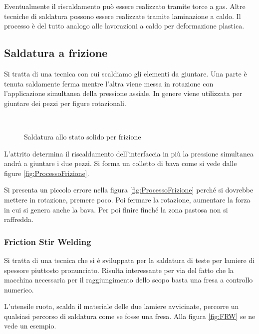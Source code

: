 Eventualmente il riscaldamento può essere realizzato tramite torce a gas. 
Altre tecniche di saldatura possono essere realizzate tramite laminazione a caldo. Il processo è del tutto analogo alle lavorazioni a caldo per deformazione plastica.

\subsection{Saldatura a frizione}
Si tratta di una tecnica con cui scaldiamo gli elementi da giuntare.
Una parte è tenuta saldamente ferma mentre l'altra viene messa in rotazione con l'applicazione simultanea della pressione assiale. In genere viene utilizzata per giuntare dei pezzi per figure rotazionali.

\begin{figure}
\centering
{}\quad
{}\\
\caption{Saldatura allo stato solido per frizione}
\label{fig:Frizione}
\end{figure}

L'attrito determina il riscaldamento dell'interfaccia in più la pressione simultanea andrà a giuntare i due pezzi. Si forma un colletto di bava come si vede dalle figure \ref{fig:ProcessoFrizione}.

Si presenta un piccolo errore nella figura \ref{fig:ProcessoFrizione} perché si dovrebbe mettere in rotazione, premere poco.
Poi fermare la rotazione, aumentare la forza in cui si genera anche la bava. 
Per poi finire finché la zona pastosa non si raffredda.

\subsubsection{Friction Stir Welding}
Si tratta di una tecnica che si è sviluppata per la saldatura di teste per lamiere di spessore piuttosto pronunciato. 
Risulta interessante per via del fatto che la macchina necessaria per il raggiungimento dello scopo basta una fresa a controllo numerico.

L'utensile ruota, scalda il materiale delle due lamiere avvicinate, percorre un qualsiasi percorso di saldatura come se fosse una fresa. 
Alla figura \ref{fig:FRW} se ne vede un esempio.

